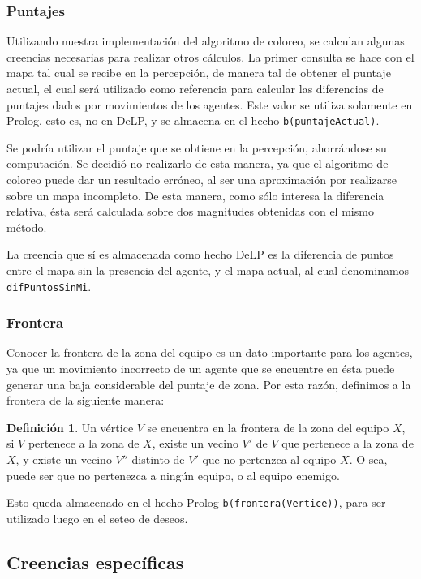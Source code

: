 \documentclass[oneside]{book}
\theoremstyle{definition}
\newtheorem{definicion}{Definición}[section]
\theoremstyle{example}
\begin{document}
\subsubsection{Puntajes}

Utilizando nuestra implementación del algoritmo de coloreo, se calculan algunas
creencias necesarias para realizar otros cálculos. La primer consulta se hace con
el mapa tal cual se recibe en la percepción, de manera tal de obtener el puntaje
actual, el cual será utilizado como referencia para calcular las diferencias de
puntajes dados por movimientos de los agentes. Este valor se utiliza solamente
en Prolog, esto es, no en DeLP, y se almacena en el hecho \texttt{b(puntajeActual)}.

Se podría utilizar el puntaje que se obtiene en la percepción, ahorrándose
su computación. Se decidió no realizarlo de esta manera, ya que el algoritmo de 
coloreo puede dar un resultado erróneo, al ser una aproximación por realizarse
sobre un mapa incompleto. De esta manera, como sólo interesa la diferencia 
relativa, ésta será calculada sobre dos magnitudes obtenidas con el mismo 
método.

La creencia que sí es almacenada como hecho DeLP es la diferencia de puntos entre
el mapa sin la presencia del agente, y el mapa actual, al cual denominamos
\texttt{difPuntosSinMi}.


\subsubsection{Frontera}

Conocer la frontera de la zona del equipo es un dato importante para los agentes,
ya que un movimiento incorrecto de un agente que se encuentre en ésta puede 
generar una baja considerable del puntaje de zona. Por esta razón, definimos a
la frontera de la siguiente manera:

\begin{definicion}
Un vértice $V$ se encuentra en la frontera de la zona del equipo $X$, si $V$ 
pertenece a la zona de $X$, existe un vecino $V'$ de $V$ que pertenece a la zona 
de $X$, y existe un vecino $V''$ distinto de $V'$ que no pertenzca al equipo $X$. 
O sea, puede ser que no pertenezca a ningún equipo, o al equipo enemigo.
\end{definicion}

Esto queda almacenado en el hecho Prolog \texttt{b(frontera(Vertice))}, para ser
utilizado luego en el seteo de deseos.

\subsection{Creencias específicas}
\end{document}
